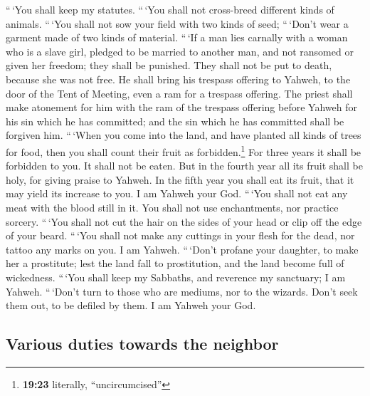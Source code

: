  ``\,`You shall keep my statutes. ``\,`You shall not
cross-breed different kinds of animals. ``\,`You shall not sow your
field with two kinds of seed; ``\,`Don't wear a garment made of two
kinds of material.  ``\,`If a man lies carnally with a
woman who is a slave girl, pledged to be married to another man, and not
ransomed or given her freedom; they shall be punished. They shall not be
put to death, because she was not free.  He shall bring
his trespass offering to Yahweh, to the door of the Tent of Meeting,
even a ram for a trespass offering.  The priest shall
make atonement for him with the ram of the trespass offering before
Yahweh for his sin which he has committed; and the sin which he has
committed shall be forgiven him.  ``\,`When you come into
the land, and have planted all kinds of trees for food, then you shall
count their fruit as forbidden.\footnote{\textbf{19:23} literally,
  ``uncircumcised''} For three years it shall be forbidden to you. It
shall not be eaten.  But in the fourth year all its fruit
shall be holy, for giving praise to Yahweh.  In the fifth
year you shall eat its fruit, that it may yield its increase to you. I
am Yahweh your God.  ``\,`You shall not eat any meat with
the blood still in it. You shall not use enchantments, nor practice
sorcery.  ``\,`You shall not cut the hair on the sides of
your head or clip off the edge of your beard.  ``\,`You
shall not make any cuttings in your flesh for the dead, nor tattoo any
marks on you. I am Yahweh.  ``\,`Don't profane your
daughter, to make her a prostitute; lest the land fall to prostitution,
and the land become full of wickedness.  ``\,`You shall
keep my Sabbaths, and reverence my sanctuary; I am Yahweh.
 ``\,`Don't turn to those who are mediums, nor to the
wizards. Don't seek them out, to be defiled by them. I am Yahweh your
God.

\hypertarget{various-duties-towards-the-neighbor}{%
\subsection{Various duties towards the
neighbor}\label{various-duties-towards-the-neighbor}}

